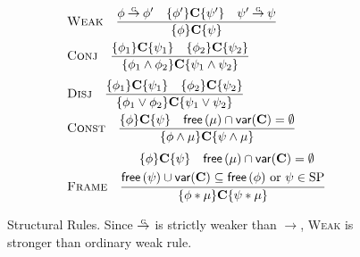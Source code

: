 \documentclass[conference,compsoc, 10pt]{IEEEtran}
\newcommand {\free }[1] {{\mathsf{free}\left(#1\right)}}
\newcommand {\var } {\mathsf{var}}
\newcommand {\prog } {{\mathbf{C}}}
\newcommand{\sd}{\diamond}%
\DeclareRobustCommand{\gimp}{%
	\mathbin{\ooalign{$\rightarrow$\cr\hss\raisebox{1ex}{\scalebox{.5}{G}}\hss}}}
\begin{document}
	\begin{figure}\centering
		\begin{equation*}\begin{split}
		&\textsc{Weak}\quad  \frac{\phi\gimp\phi^\prime\quad \{\phi^{\prime}\}\prog\{\psi^{\prime}\}\quad 
			\psi^{\prime}\gimp\psi  }{\{\phi\}\prog\{\psi\}} \\
		&\textsc{Conj}\quad \frac{\{\phi_1\}\prog\{\psi_1\}\quad\{\phi_2\}\prog\{\psi_2\}}{\{\phi_1\wedge \phi_2\}\prog\{\psi_1\wedge \psi_2\}} \\[0.1cm]
		&\textsc{Disj}\quad \frac{\{\phi_1\}\prog\{\psi_1\}\quad\{\phi_2\}\prog\{\psi_2\}}{\{\phi_1\vee\phi_2\}\prog\{\psi_1\vee\psi_2\}} \\
		&\textsc{Const}\quad \frac{\{\phi\}\prog\{\psi\}\quad\free{\mu}\cap\var(\prog)=\emptyset}{\{\phi\wedge\mu\}\prog\{\psi\wedge\mu\}} \\[0.1cm]
		&\textsc{Frame}\quad \frac{\begin{split}\{\phi\}\prog\{\psi\}&\quad\free{\mu}\cap\var(\prog)=\emptyset\\ \free{\psi}\cup\var&(\prog)\subseteq\free{\phi}\text{\ or\ }\psi\in{\rm SP} \end{split}}{\{\phi\ast\mu\}\prog\{\psi\ast\mu\}} %
		\end{split}\end{equation*}
		\caption{Structural Rules. Since $\gimp$ is strictly weaker than $\rightarrow$, \textsc{Weak} is stronger than ordinary weak rule.
		}\label{fig proof system 2}
	\end{figure}
	
\end{document}
